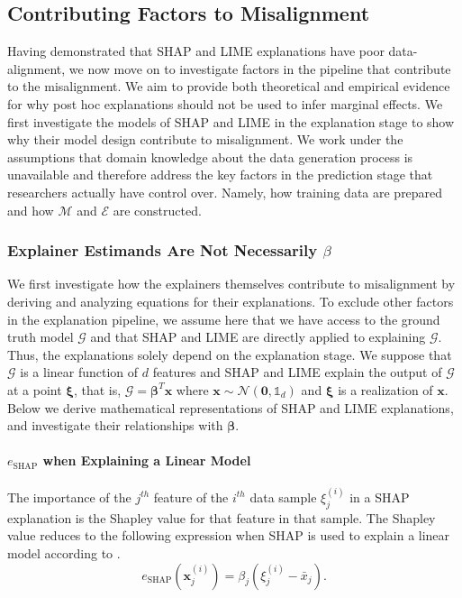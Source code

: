 \documentclass[mnsc,blindrev]{informs3}
\begin{document}
    \subsection{Contributing Factors to  Misalignment}
        \label{sec:causes_of_misalignment}
        Having demonstrated that SHAP and LIME explanations have poor data-alignment, we now move on to investigate factors in the pipeline that contribute to the misalignment. We aim to provide both theoretical and empirical evidence for why post hoc explanations should not be used to infer marginal effects. We first investigate the models of SHAP and LIME in the explanation stage to show why their model design contribute to misalignment. We work under the assumptions that domain knowledge about the data generation process is unavailable and therefore address the key factors in the prediction stage that researchers actually have control over. Namely, how training data are prepared and how $\mathcal{M}$ and $\mathcal{E}$ are constructed.%


    \subsubsection{Explainer Estimands Are Not Necessarily $\beta$}
    \label{sec:theoretical_considerations}
   We first investigate how the explainers themselves contribute to misalignment by deriving and analyzing equations for their explanations. To exclude other factors in the explanation pipeline, we assume here that we have access to the ground truth model $\mathcal{G}$ and that SHAP and LIME are directly applied to explaining $\mathcal{G}$. Thus, the explanations solely depend on the explanation stage. We suppose that $\mathcal{G}$ is a linear function of $d$ features and SHAP and LIME explain the output of $\mathcal{G}$ at a point $\boldsymbol{\xi}$, that is, $\mathcal{G} = \boldsymbol{\beta}^T \mathbf{x}$ where $\mathbf{x} \sim \mathcal{N}(\mathbf{0},\mathds{1}_d)$ and $\boldsymbol{\xi}$ is a realization of $\mathbf{x}$. Below we derive mathematical representations of SHAP and LIME explanations, and investigate their relationships with $\boldsymbol{\beta}$.

         \paragraph{$e_{\text{SHAP}}$ when Explaining a Linear Model}
              The importance of the $j^{th}$ feature of the $i^{th}$ data sample $\xi^{(i)}_j$ in a SHAP explanation is the Shapley value for that feature in that sample. The Shapley value reduces to the following expression when SHAP is used to explain a linear model according to \cite{StrumbeljErik2014Epma,lundberg17shap}. 
             \begin{equation}
                \label{eqn:shap_gt}
                e_\text{SHAP}(\mathbf{x}^{(i)}_j) = \beta_j (\xi^{(i)}_j - \bar{x}_j).
             \end{equation}
\end{document}

